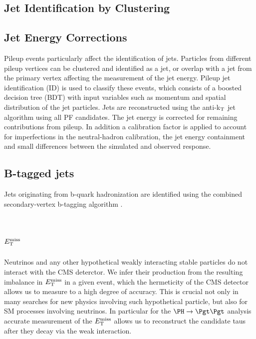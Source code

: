 \subsection{Jet Identification by Clustering}
\label{sec:jetID}

\subsection{Jet Energy Corrections}
\label{sec:JEC}

Pileup events particularly affect the identification of jets. Particles from
different pileup vertices can be clustered and identified as a jet, or overlap
with a jet from the primary vertex affecting the measurement of the jet energy.
Pileup jet identification (ID) is used to classify these events, which consists
of a boosted decision tree (BDT) \cite{TMVA} with input variables such as
momentum and spatial distribution of the jet particles. Jets are reconstructed
using the anti-k$_{\rm{T}}$ jet algorithm \cite{antikt} using all PF candidates.
The jet energy is corrected for remaining contributions from pileup. In addition
a calibration factor is applied to account for imperfections in the
neutral-hadron calibration, the jet energy containment and small differences
between the simulated and observed response.

\subsection{B-tagged jets}
\label{sec:btag}

Jets originating from b-quark
hadronization are identified using the combined secondary-vertex b-tagging
algorithm \cite{bjets}.

\section{$E_{\mathrm{T}}^{\text{miss}}$}
\label{sec:met}

Neutrinos and any other hypothetical weakly interacting stable particles do not
interact with the CMS deterctor. We infer their production from the resulting
imbalance in $E_{\mathrm{T}}^{\text{miss}}$ in a given event, which the hermeticity of the CMS detector
allows us to measure to a high degree of accuracy. This is crucial not only in
many searches for new physics involving such hypothetical particle, but also for
\ac{SM} processes involving neutrinos. In particular for the $\PH \to \Pgt\Pgt$
analysis accurate measurement of the $E_{\mathrm{T}}^{\text{miss}}$ allows us to reconstruct the
candidate taus after they decay via the weak interaction.

